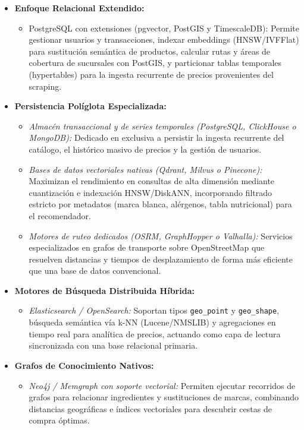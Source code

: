 \begin{tcolorbox}[colback=responsecolor, title=Insights de Gemini, colframe=gray!60!black, breakable]
	\begin{itemize}
		\item \textbf{Enfoque Relacional Extendido:} 
		\begin{itemize}
			\item PostgreSQL con extensiones (pgvector, PostGIS y TimescaleDB): 
			Permite gestionar usuarios y transacciones, indexar embeddings (HNSW/IVFFlat) para sustitución semántica de productos, calcular rutas y áreas de cobertura de sucursales con PostGIS, y particionar tablas temporales (hypertables) para la ingesta recurrente de precios provenientes del scraping.
		\end{itemize}
		
		\item \textbf{Persistencia Políglota Especializada:} 
		\begin{itemize}
			\item \textit{Almacén transaccional y de series temporales (PostgreSQL, ClickHouse o MongoDB):} 
			Dedicado en exclusiva a persistir la ingesta recurrente del catálogo, el histórico masivo de precios y la gestión de usuarios.
			\item \textit{Bases de datos vectoriales nativas (Qdrant, Milvus o Pinecone):} 
			Maximizan el rendimiento en consultas de alta dimensión mediante cuantización e indexación HNSW/DiskANN, incorporando filtrado estricto por metadatos (marca blanca, alérgenos, tabla nutricional) para el recomendador.
			\item \textit{Motores de ruteo dedicados (OSRM, GraphHopper o Valhalla):} 
			Servicios especializados en grafos de transporte sobre OpenStreetMap que resuelven distancias y tiempos de desplazamiento de forma más eficiente que una base de datos convencional.
		\end{itemize}
		
		\item \textbf{Motores de Búsqueda Distribuida Híbrida:} 
		\begin{itemize}
			\item \textit{ Elasticsearch / OpenSearch:}
			Soportan tipos \texttt{geo\_point} y \texttt{geo\_shape}, búsqueda semántica vía k-NN (Lucene/NMSLIB) y agregaciones en tiempo real para analítica de precios, actuando como capa de lectura sincronizada con una base relacional primaria.
		\end{itemize}
		
		\item \textbf{Grafos de Conocimiento Nativos:} 
		\begin{itemize}
			\item \textit{ Neo4j / Memgraph con soporte vectorial:}
			Permiten ejecutar recorridos de grafos para relacionar ingredientes y sustituciones de marcas, combinando distancias geográficas e índices vectoriales para descubrir cestas de compra óptimas.
		\end{itemize}
		
	\end{itemize}
\end{tcolorbox}

